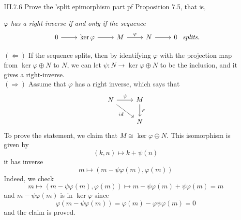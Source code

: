 \begin{problem}{III.7.6}
Prove the 'split epimorphism part pf Proposition 7.5, that is,

\textit{$\varphi$ has a right-inverse if and only if the sequence} 
\[
\begin{tikzcd}
0 \arrow[r] & \ker \varphi \arrow[r] & M \arrow[r, "\varphi"] & N \arrow[r] & 0
\end{tikzcd}	
\textit{ splits.}
\]
\end{problem}
\begin{pf}

\noindent $(\Leftarrow)$ If the sequence splits, then by identifying $\varphi$ with the projection map from $\ker \varphi \oplus N$ to $N$, we can let $\psi : N \to \ker \varphi \oplus N $ to be the inclusion, and it gives a right-inverse. \\
$(\Rightarrow)$ Assume that $\varphi$ has a right inverse, which says that 
\[
\begin{tikzcd}
N \arrow[r, "\psi"] \arrow[rd, "id"'] & M \arrow[d, "\varphi"] \\
& N
\end{tikzcd}	
\]
To prove the statement, we claim that $M \cong \ker \varphi \oplus N$. This isomorphism is given by 
\[
(k,n) \mapsto k + \psi (n)
\]
it has inverse
\[
m \mapsto (m-\psi\varphi(m), \varphi(m))	
\]
Indeed, we check
\[
m \mapsto (m-\psi\varphi(m), \varphi(m)) \mapsto m-\psi\varphi(m) + \psi\varphi(m) = m
\]
and $m-\psi\varphi(m)$ is in $\ker \varphi$ since
\[
\varphi(m-\psi\varphi(m)) = \varphi(m) - \varphi\psi\varphi(m) = 0
\]
and the claim is proved.
\end{pf}